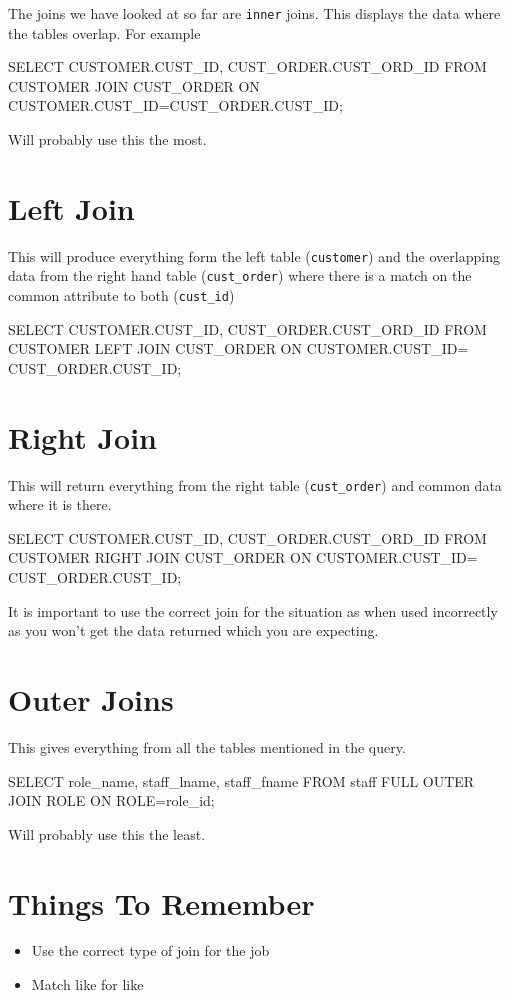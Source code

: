 
The joins we have looked at so far are \texttt{inner} joins. This displays the data where the tables overlap. For example
\begin{sql}
SELECT CUSTOMER.CUST_ID, CUST_ORDER.CUST_ORD_ID FROM CUSTOMER 
JOIN CUST_ORDER ON CUSTOMER.CUST_ID=CUST_ORDER.CUST_ID;
\end{sql}
Will probably use this the most.

\section*{Left Join}
This will produce everything form the left table (\texttt{customer}) and the overlapping data from the right hand table (\texttt{cust\_order}) where there is a match on the common attribute to both (\texttt{cust\_id})
\begin{sql}
SELECT CUSTOMER.CUST_ID, CUST_ORDER.CUST_ORD_ID FROM CUSTOMER
LEFT JOIN CUST_ORDER ON CUSTOMER.CUST_ID= CUST_ORDER.CUST_ID;
\end{sql}

\section*{Right Join}
This will return everything from the right table (\texttt{cust\_order}) and common data where it is there. 
\begin{sql}
SELECT CUSTOMER.CUST_ID, CUST_ORDER.CUST_ORD_ID FROM CUSTOMER
RIGHT JOIN CUST_ORDER ON CUSTOMER.CUST_ID= CUST_ORDER.CUST_ID;
\end{sql}
It is important to use the correct join for the situation as when used incorrectly as you won't get the data returned which you are expecting.

\section*{Outer Joins}
This gives everything from all the tables mentioned in the query.
\begin{sql}
SELECT role_name, staff_lname, staff_fname FROM staff FULL OUTER JOIN
ROLE ON ROLE=role_id;
\end{sql}
Will probably use this the least.

\section*{Things To Remember}
\begin{itemize}
    \item Use the correct type of join for the job
    \item Match like for like
\end{itemize}